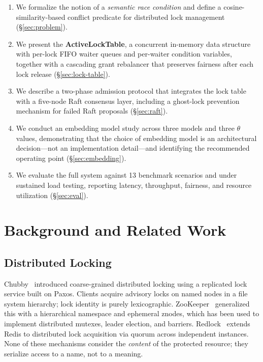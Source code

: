 \documentclass[sigconf]{acmart}
\begin{document}
\begin{enumerate}
\item We formalize the notion of a \emph{semantic race condition} and define a
  cosine-similarity-based conflict predicate for distributed lock management
  (\S\ref{sec:problem}).

\item We present the \textbf{ActiveLockTable}, a concurrent in-memory data structure
  with per-lock FIFO waiter queues and per-waiter condition variables, together with a
  cascading grant rebalancer that preserves fairness after each lock release
  (\S\ref{sec:lock-table}).

\item We describe a two-phase admission protocol that integrates the lock table with a
  five-node Raft consensus layer, including a ghost-lock prevention mechanism for failed
  Raft proposals (\S\ref{sec:raft}).

\item We conduct an embedding model study across three models and three $\theta$ values,
  demonstrating that the choice of embedding model is an architectural decision—not an
  implementation detail—and identifying the recommended operating point
  (\S\ref{sec:embedding}).

\item We evaluate the full system against 13 benchmark scenarios and under sustained load
  testing, reporting latency, throughput, fairness, and resource utilization
  (\S\ref{sec:eval}).
\end{enumerate}

\section{Background and Related Work}
\label{sec:background}

\subsection{Distributed Locking}

Chubby~\cite{chubby} introduced coarse-grained distributed locking using a replicated
lock service built on Paxos. Clients acquire advisory locks on named nodes in a file
system hierarchy; lock identity is purely lexicographic. ZooKeeper~\cite{zookeeper}
generalized this with a hierarchical namespace and ephemeral znodes, which has been used
to implement distributed mutexes, leader election, and barriers. Redlock~\cite{redlock}
extends Redis to distributed lock acquisition via quorum across independent instances.
None of these mechanisms consider the \emph{content} of the protected resource; they
serialize access to a name, not to a meaning.
\end{document}
